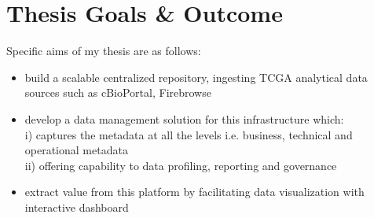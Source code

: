 \section{Thesis Goals \& Outcome}
\label{goals}
Specific aims of my thesis are as follows:
\begin{itemize}
	\item build a scalable centralized repository, ingesting TCGA analytical data sources such as cBioPortal, Firebrowse 
	\item  develop a data management solution for this infrastructure which:
	\\ i) captures the metadata at all the levels i.e. business, technical and operational metadata
	\\ ii) offering capability to data profiling, reporting and governance
	\item  extract value from this platform by facilitating data visualization with interactive dashboard
	
\end{itemize}